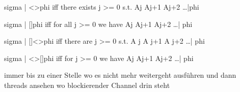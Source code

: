 \documentclass[landscape, a4paper]{article}
\begin{document}
\begin{minipage}[t]{0.19\linewidth}
\begin{betterlist}
		\item sigma |\raisebox{0.5mm}{=} <>phi iff there exists j >= 0 s.t. Aj Aj+1 Aj+2 \ldots |\raisebox{0.5mm}{=}phi
		\item sigma |\raisebox{0.5mm}{=} []phi iff for all j >= 0 we have Aj Aj+1 Aj+2 \ldots |\raisebox{0.5mm}{=} phi
		\item sigma |\raisebox{0.5mm}{=} []<>phi iff there are  j >= 0 s.t. A j A j+1 A j+2 \ldots |\raisebox{0.5mm}{=} phi
		\item sigma |\raisebox{0.5mm}{=} <>[]phi iff for  j >= 0 we have Aj Aj+1 Aj+2 \ldots |\raisebox{0.5mm}{=} phi
	\end{betterlist}
	\begin{betterlist}
		\item immer bis zu einer Stelle wo es nicht mehr weitergeht ausführen und dann threads ansehen wo blockierender Channel drin steht
	\end{betterlist}
\end{minipage}
\end{document}
